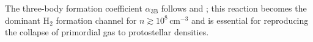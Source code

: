 


The three-body formation coefficient $\alpha_{3\mathrm{B}}$
follows \citet{Abel_2002} and \citet{Palla_1983}; this reaction
becomes the dominant H$_2$ formation channel for
$n \gtrsim 10^8\,\mathrm{cm}^{-3}$ and is essential for
reproducing the collapse of primordial gas to protostellar densities.



